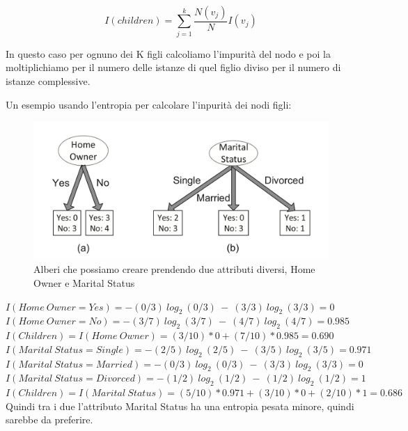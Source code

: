 \documentclass[14pt]{extreport}
\begin{document}
\begin{equation}
    I(children) = \sum\limits_{j=1}^{k} \frac{N(v_j)}{N} I(v_j)
\end{equation}

In questo caso per ognuno dei K figli calcoliamo l'impurità del nodo e poi la moltiplichiamo per il numero delle istanze di quel figlio diviso per il numero di istanze complessive.

Un esempio usando l'entropia per calcolare l'inpurità dei nodi figli:


\begin{figure}[H]
  \centering\includegraphics[width=\linewidth]{TestCondition1.png}
  \caption{Alberi che possiamo creare prendendo due attributi diversi, Home Owner e Marital Status}
\end{figure}
\newline\newline$I(Home\ Owner = Yes) = - (0/3)\ log_2\ (0/3)\ -\ (3/3)\ log_2\ (3/3) = 0$
\newline
$I(Home\ Owner = No) =  - (3/7)\ log_2\ (3/7)\ -\ (4/7)\ log_2\ (4/7) = 0.985 $ \newline
$I(Children) = I(Home\ Owner) = (3/10) * 0 + (7/10) * 0.985 = 0.690
$  \newline\newline$I(Marital \ Status = Single) =- (2/5)\ log_2\ (2/5)\ -\ (3/5)\ log_2\ (3/5) = 0.971$  \newline
    $I(Marital \ Status = Married) = - (0/3)\ log_2\ (0/3)\ -\ (3/3)\ log_2\ (3/3) = 0$ \newline
    $I(Marital \ Status = Divorced) = - (1/2)\ log_2\ (1/2)\ -\ (1/2)\ log_2\ (1/2) = 1$ \newline
    $I(Children) = I(Marital \ Status) = (5/10) * 0.971 + (3/10) * 0 + (2/10) * 1 = 0.686$
\newline
\newline
Quindi tra i due l'attributo Marital Status ha una entropia pesata minore, quindi sarebbe da preferire.
\end{document}
